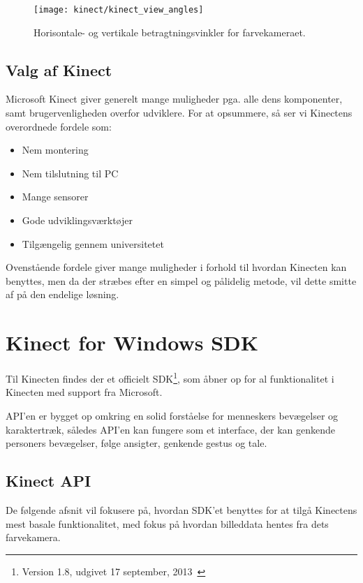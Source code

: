 \begin{figure}
\centering
\texttt{[image: kinect/kinect\_view\_angles]}
\caption{Horisontale- og vertikale betragtningsvinkler for farvekameraet.}
\label{kinect:vinkler}
\end{figure}

\subsection{Valg af Kinect}\label{kinect:argumentation}
Microsoft Kinect giver generelt mange muligheder pga. alle dens komponenter, samt brugervenligheden overfor udviklere.
For at opsummere, så ser vi Kinectens overordnede fordele som:

\begin{itemize}
\item Nem montering
\item Nem tilslutning til PC
\item Mange sensorer
\item Gode udviklingsværktøjer
\item Tilgængelig gennem universitetet
\end{itemize}


Ovenstående fordele giver mange muligheder i forhold til hvordan Kinecten kan benyttes, men da der stræbes efter en simpel og pålidelig metode, vil dette smitte af på den endelige løsning.

\section{Kinect for Windows SDK}
Til Kinecten findes der et officielt SDK\footnote{ Version 1.8, udgivet 17 september, 2013~\cite{kinectSDK18}}, som åbner op for al funktionalitet i Kinecten med support fra Microsoft.

API'en er bygget op omkring en solid forståelse for menneskers bevægelser og karaktertræk, således API'en kan fungere som et interface, der kan genkende personers bevægelser, følge ansigter, genkende gestus og tale.

\subsection{Kinect API}\label{kinect:kinectapi}
De følgende afsnit vil fokusere på, hvordan SDK'et benyttes for at tilgå Kinectens mest basale funktionalitet, med fokus på hvordan billeddata hentes fra dets farvekamera.


